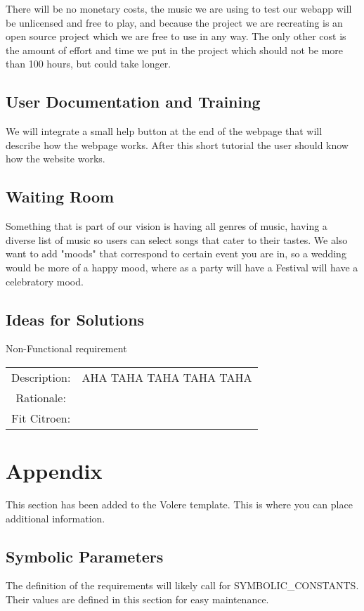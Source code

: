 \documentclass[12pt, titlepage]{article}
\begin{document}
There will be no monetary costs, the music we are using to test our webapp will be unlicensed and free to play, and because the project we are recreating is an open source project which we are free to use in any way. The only other cost is the amount of effort and time we put in the project which should not be more than 100 hours, but could take longer.

\subsection{User Documentation and Training}

We will integrate a small help button at the end of the webpage that will describe how the webpage works. After this short tutorial the user should know how the website works.

\subsection{Waiting Room}

Something that is part of our vision is having all genres of music, having a diverse list of music so users can select songs that cater to their tastes. We also want to add "moods" that correspond to certain event you are in, so a wedding would be more of a happy mood, where as a party will have a Festival will have a celebratory mood.

\subsection{Ideas for Solutions}

\begin{center}
Non-Functional requirement \\
\begin{tabular}{| c | c | }
\hline
Description:& AHA TAHA TAHA TAHA TAHA   \\ 
 Rationale: & \\
Fit Citroen: & \\
\hline
\end{tabular}
\end{center}

\newpage





\newpage

\section{Appendix}

This section has been added to the Volere template.  This is where you can place
additional information.

\subsection{Symbolic Parameters}

The definition of the requirements will likely call for SYMBOLIC\_CONSTANTS.
Their values are defined in this section for easy maintenance.
\end{document}
